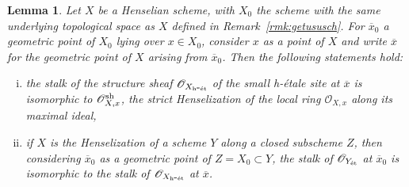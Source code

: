 \documentclass[12pt]{article}
\renewcommand{\O}{\mathscr{O}}
\newcommand{\ol}[1]{\overline{#1}}
\newcommand{\hetale}{h-\'etale\xspace}
\newcommand{\et}{{\rm\acute{e}t}}
\newcommand{\het}{{\rm h\mbox{-}\et}}
\newtheorem{lemma}[theorem]{Lemma}
\theoremstyle{definition}
\numberwithin{equation}{subsection}
\begin{document}
\begin{lemma}\label{lem:stalkhet} Let $X$ be a Henselian scheme, with $X_0$ the scheme with the same underlying topological space as $X$ defined in Remark~\ref{rmk:getususch}. For $\ol{x}_0$ a geometric point of $X_0$ lying over $x \in X_0$, consider $x$ as a point of $X$ and write $\ol{x}$ for the geometric point of $X$ arising from $\ol{x}_0$. Then the following statements hold:

\begin{enumerate}[(i)]
\item the stalk of the structure sheaf $\O_{X_{\het}}$ of the small \hetale site at $\ol{x}$ is isomorphic to $\O_{X,x}^{\rm sh}$, the strict Henselization of the local ring $\O_{X,x}$ along its {\it maximal ideal},

\item if $X$ is the Henselization of a scheme $Y$ along a closed subscheme $Z$, then considering $\ol{x}_0$ as a geometric point of $Z=X_0 \subset Y$, the stalk of $\O_{Y_{\et}}$ at $\ol{x}_0$ is isomorphic to the stalk of $\O_{X_{\het}}$ at $\ol{x}$. 
\end{enumerate}
\end{lemma}
\end{document}

